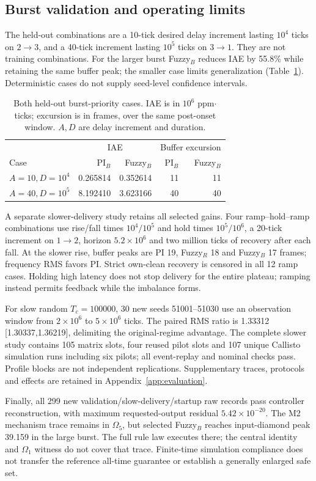 \subsection{Burst validation and operating limits}
\label{subsec:eval_burst}
The held-out combinations are a 10-tick desired delay increment
lasting $10^4$ ticks on $2\to3$, and a 40-tick increment lasting
$10^5$ ticks on $3\to1$. They are not training combinations.
For the larger burst Fuzzy$_B$ reduces IAE by 55.8\% while retaining
the same buffer peak; the smaller case limits generalization
(Table~\ref{tab:eval_heldout_bursts}). Deterministic cases do not
supply seed-level confidence intervals.

\begin{table}[t]
\caption{Both held-out burst-priority cases. IAE is in $10^6$
ppm$\cdot$ticks; excursion is in frames, over the same post-onset window.
$A,D$ are delay increment and duration.}
\label{tab:eval_heldout_bursts}
\centering
\begin{tabular}{@{}lrrrr@{}}\toprule
 & \multicolumn{2}{c}{IAE} & \multicolumn{2}{c}{Buffer excursion}\\
Case & PI$_B$ & Fuzzy$_B$ & PI$_B$ & Fuzzy$_B$\\\midrule
$A=10,D=10^4$ & 0.265814 & 0.352614 & 11 & 11\\
$A=40,D=10^5$ & 8.192410 & 3.623166 & 40 & 40\\\bottomrule
\end{tabular}
\end{table}

A separate slower-delivery study retains all selected gains. Four
ramp--hold--ramp combinations use rise/fall times $10^4/10^5$ and
hold times $10^5/10^6$, a 20-tick increment on $1\to2$, horizon
$5.2\times10^6$ and two million ticks of recovery after each fall.
At the slower rise, buffer peaks are PI 19, Fuzzy$_R$ 18 and
Fuzzy$_B$ 17 frames; frequency RMS favors PI. Strict own-clean
recovery is censored in all 12 ramp cases. Holding high latency
does not stop delivery for the entire plateau; ramping instead
permits feedback while the imbalance forms.

For slow random $T_c=100000$, 30 new seeds 51001--51030 use
an observation window from $2\times10^6$ to $5\times10^6$ ticks.
The paired RMS ratio is 1.33312
[1.30337,1.36219], delimiting the original-regime advantage.
The complete slower study contains 105 matrix slots, four reused
pilot slots and 107 unique Callisto simulation runs including six pilots; all
event-replay and nominal checks pass. Profile blocks are not
independent replications. Supplementary traces, protocols and
effects are retained in Appendix~\ref{app:evaluation}.

Finally, all 299 new validation/slow-delivery/startup raw records
pass controller reconstruction, with maximum requested-output
residual $5.42\times10^{-20}$. The M2 mechanism trace remains in
$\Omega_5$, but selected Fuzzy$_B$ reaches input-diamond peak
39.159 in the large burst. The full rule law executes there;
the central identity and $\Omega_1$ witness do not cover that trace.
Finite-time simulation compliance does not transfer the reference
all-time guarantee or establish a generally enlarged safe set.
